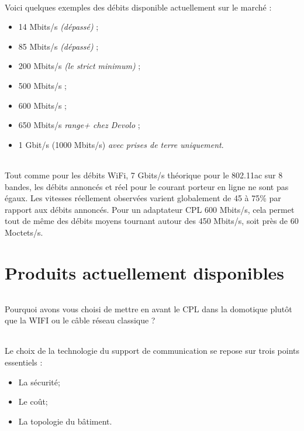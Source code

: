             \paragraph{}
Voici quelques exemples des débits disponible actuellement sur le marché :
                \begin{itemize}
                    \item 14 Mbits/s \emph{(dépassé)} ;
                    \item 85 Mbits/s \emph{(dépassé)} ;
                    \item 200 Mbits/s \emph{(le strict minimum)} ;
                    \item 500 Mbits/s ;
                    \item 600 Mbits/s ;
                    \item 650 Mbits/s \emph{range+ chez Devolo} ;
                    \item 1 Gbit/s (1000 Mbits/s) \emph{avec prises de terre uniquement}.
                \end{itemize}
            \paragraph{}
Tout comme pour les débits WiFi, 7 Gbits/s théorique pour le 802.11ac sur 8 bandes,
les débits annoncés et réel pour le courant porteur en ligne ne sont pas égaux.
Les vitesses réellement observées varient globalement de 45 à 75\% par rapport aux débits annoncés.
Pour un adaptateur CPL 600 Mbits/s, cela permet tout de même des débits moyens tournant autour des 450 Mbits/s, soit près de 60 Moctets/s.

    \clearpage

\part{Produits actuellement disponibles}
    \paragraph{}
Pourquoi avons vous choisi de mettre en avant le CPL dans la domotique plutôt que la WIFI ou le câble réseau classique ?
    \paragraph{}
Le choix de la technologie du support de communication se repose sur trois points essentiels :
        \begin{itemize}
            \item La sécurité;
            \item Le coût;
            \item La topologie du bâtiment.
        \end{itemize}
